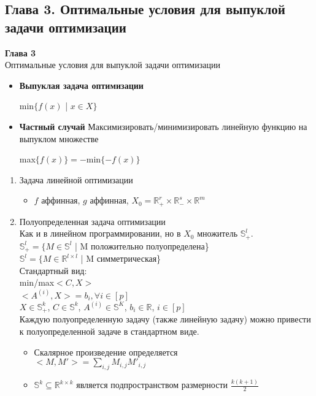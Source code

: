 \newpage
\subsection{Глава 3. Оптимальные условия для выпуклой задачи оптимизации}
\begin {center}
{\bf Глава 3}\\
Оптимальные условия для выпуклой задачи оптимизации
\end {center}

\begin {itemize}
\item {\bf Выпуклая задача оптимизации}
\begin {center}
min$\{f(x)$ | $x \in X\}$
\end {center}
\item {\bf Частный случай} Максимизировать/минимизировать линейную функцию на выпуклом множестве
\begin {center}
max$\{f(x)\}=-$min$\{-f(x)\}$
\end {center}
\end {itemize}

\begin {enumerate}
\item Задача линейной оптимизации

 \begin {itemize}
 \item $f$ аффинная, $g$ аффинная, $X_0=\mathbb{R}_{+}^r \times \mathbb{R}_{-}^s \times \mathbb{R}^m$
 \end {itemize}

\item Полуопределенная задача оптимизации\\
Как и в линейном программировании, но в $X_0$ множитель $\mathbb{S}_{+}^l$.\\
$\mathbb{S}_{+}^l=\{M \in \mathbb{S}^l$ | M положительно полуопределена\}\\
$\mathbb{S}^l=\{M \in \mathbb{R}^{l \times l}$ | M симметрическая\}\\
Стандартный вид:\\
min/max$<C,X>$\\
$<A^{(i)},X>=b_i, \forall i \in [p]$\\
$X \in \mathbb{S}_{+}^k$, $C \in \mathbb{S}^k$, $A^{(i)} \in \mathbb{S}^K$, $b_i \in \mathbb{R}$, $i \in [p]$\\
Каждую полуопределенную задачу (также линейную задачу) можно привести к полуопределенной задаче в стандартном виде.

\begin {itemize}
\item Скалярное произведение определяется \\
$<M,M'>=\sum_{i,j}M_{i,j}M'_{i,j}$

\item $\mathbb{S}^k \subseteq \mathbb{R}^{k \times k}$ является подпространством размерности $\frac{k(k+1)}{2}$
\end {itemize}
\end {enumerate} 